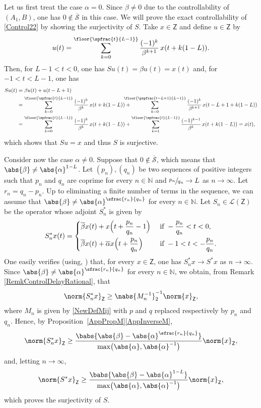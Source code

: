 Let us first treat the case $\alpha = 0$. Since $\beta \neq 0$ due to the controllability of $(A_1, B)$, one has $0 \notin \overline{\mathcal S}$ in this case. We will prove the exact controllability of \eqref{Control22} by showing the surjectivity of $S$. Take $x \in \mathsf Z$ and define $u \in \mathsf Z$ by
\[u(t) = \sum_{k=0}^{\floor{\spfrac{t}{L - 1}}} \frac{(-1)^k}{\beta^{k+1}}\, x(t + k(1 - L)).\]
Then, for $L - 1 < t < 0$, one has $S u(t) = \beta u(t) = x(t)$ and, for $-1 < t < L-1$, one has
\begin{align*}
S u(t) & = \beta u(t) + u(t - L + 1)  \\
& = \sum_{k=0}^{\floor{\spfrac{t}{L - 1}}} \frac{(-1)^k}{\beta^{k}}\, x(t + k(1 - L)) +\hspace*{-5mm} \sum_{k=0}^{\floor{\pspfrac{t - L + 1}{L - 1}}} \frac{(-1)^k}{\beta^{k+1}}\, x(t - L + 1 + k(1 - L))  \\
& = \sum_{k=0}^{\floor{\spfrac{t}{L - 1}}} \frac{(-1)^k}{\beta^{k}}\, x(t + k(1 - L)) + \sum_{k=1}^{\floor{\spfrac{t}{L - 1}}} \frac{(-1)^{k-1}}{\beta^{k}}\, x(t + k(1 - L)) = x(t),
\end{align*}
which shows that $S u = x$ and thus $S$ is surjective.

Consider now the case $\alpha \neq 0$. Suppose that $0 \notin \overline{\mathcal S}$, which means that $\abs{\beta} \neq \abs{\alpha}^{1-L}$. Let $(p_n), (q_n)$ be two sequences of positive integers such that $p_n$ and $q_n$ are coprime for every $n \in \mathbb N$ and $\sfrac{p_n}{q_n} \to L$ as $n \to \infty$. Let $r_n = q_n - p_n$. Up to eliminating a finite number of terms in the sequence, we can assume that $\abs{\beta} \neq \abs{\alpha}^{\sfrac{r_n}{q_n}}$ for every $n \in \mathbb N$. Let $S_n \in \mathcal L(\mathsf Z)$ be the operator whose adjoint $S_n^\ast$ is given by
\begin{equation*}
S_n^\ast x(t) =
\begin{dcases}
\overline\beta x(t) + x\Bigl(t + \frac{p_n}{q_n} - 1\Bigr) & \text{ if } -\frac{p_n}{q_n} < t < 0, \\
\overline\beta x(t) + \overline\alpha x\Bigl(t + \frac{p_n}{q_n}\Bigr) & \text{ if } -1 < t < -\frac{p_n}{q_n}.
\end{dcases}
\end{equation*}
One easily verifies (using, \eg \cite[Th.\,9.5]{Rudin1987Real}) that, for every $x \in \mathsf Z$, one has $S_n^\ast x \to S^\ast x$ as $n \to \infty$. Since $\abs{\beta} \neq \abs{\alpha}^{\sfrac{r_n}{q_n}}$ for every $n \in \mathbb N$, we obtain, from Remark \ref{RemkControlDelayRational}, that
\[\norm{S_n^\ast x}_{\mathsf Z} \geq \nabs{M_n^{-1}}_{2}^{-1} \norm{x}_{\mathsf Z},\]
where $M_n$ is given by \eqref{NewDefMij} with $p$ and $q$ replaced respectively by $p_n$ and $q_n$. Hence, by Proposition~\ref{AppPropM}\eqref{AppInverseM},
\[\norm{S_n^\ast x}_{\mathsf Z} \geq \frac{\babs{\abs{\beta} - \abs{\alpha}^{\sfrac{r_n}{q_n}}}}{\max\bigl(\abs{\alpha}, \abs{\alpha}^{-1}\bigr)} \norm{x}_{\mathsf Z},\]
and, letting $n \to \infty$,
\[\norm{S^\ast x}_{\mathsf Z} \geq \frac{\babs{\abs{\beta} - \abs{\alpha}^{1-L}}}{\max\bigl(\abs{\alpha}, \abs{\alpha}^{-1}\bigr)} \norm{x}_{\mathsf Z},\]
which proves the surjectivity of $S$.


